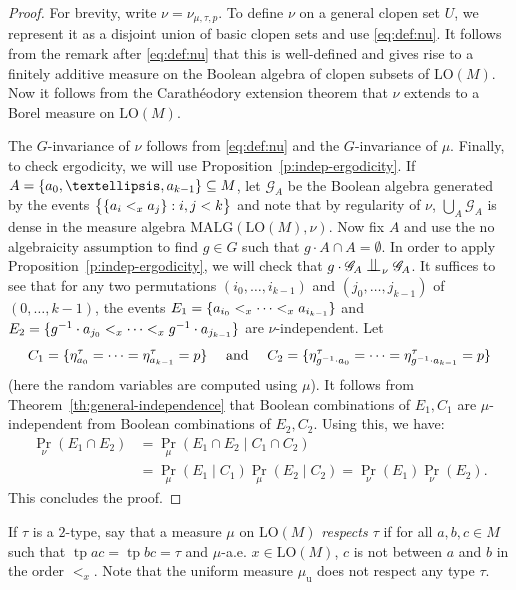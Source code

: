 \documentclass[11pt]{article}
\providecommand{\And}{}\numberwithin{equation}{section}
\let\mathcal\mathscr
\let\sub\subseteq
\theoremstyle{plain}
\theoremstyle{definition}
\newcommand{\cG}{\mathcal{G}}
\DeclareMathOperator{\tp}{tp}
\DeclarePairedDelimiter\set{\{}{\}}
\newcommand{\LO}{\mathrm{LO}}
\newcommand{\MALG}{\mathrm{MALG}}
\newcommand{\muu}{\mu_{\mathrm{u}}}
\renewcommand{\And}{\text{ and }}
\newcommand{\indep}[1][]{%
  \mathrel{
    \mathop{
      \scalebox{1}[1.3]{\text{$\perp\!\!\!\perp$}}
    }\displaylimits_{#1}
  }
}
\begin{document}
\begin{proof}
For brevity, write $\nu = \nu_{\mu, \tau, p}$. To define $\nu$ on a general clopen set $U$, we represent it as a disjoint union of basic clopen sets and use \eqref{eq:def:nu}. It follows from the remark after \eqref{eq:def:nu} that this is well-defined and gives rise to a finitely additive measure on the Boolean algebra of clopen subsets of $\LO(M)$. Now it follows from the Carathéodory extension theorem that $\nu$ extends to a Borel measure on $\LO(M)$.

The $G$-invariance of $\nu$ follows from \eqref{eq:def:nu} and the $G$-invariance of $\mu$. Finally, to check ergodicity, we will use Proposition~\ref{p:indep-ergodicity}. If $A = \set{a_0, \ldots, a_{k-1}} \sub M$, let $\cG_A$ be the Boolean algebra generated by the events $\set[\big]{\set{a_i <_x a_j} : i, j < k}$ and note that by regularity of $\nu$, $\bigcup_A \cG_A$ is dense in the measure algebra $\MALG(\LO(M), \nu)$. Now fix $A$ and use the no algebraicity assumption to find $g \in G$ such that $g \cdot A \cap A = \emptyset$. In order to apply Proposition~\ref{p:indep-ergodicity}, we will check that $g \cdot \cG_A \indep_\nu \cG_A$. It suffices to see that for any two permutations $(i_0, \ldots, i_{k-1})$ and $(j_0, \ldots, j_{k-1})$ of $(0, \ldots, k-1)$, the events $E_1 = \set{a_{i_0} <_x \cdots <_x a_{i_{k-1}}}$ and $E_2 = \set{g^{-1} \cdot a_{j_0} <_x \cdots <_x g^{-1} \cdot a_{j_{k-1}}}$ are $\nu$-independent. Let\vspace*{-3pt}
\[
C_1 = \set{\eta_{a_0}^\tau = \cdots = \eta_{a_{k-1}}^\tau = p} \quad\And\quad C_2 = \set{\eta_{g^{-1} \cdot a_0}^\tau = \cdots = \eta_{g^{-1} \cdot a_{k-1}}^\tau = p}
\]
(here the random variables are computed using $\mu$). It follows from Theorem~\ref{th:general-independence} that Boolean combinations of $E_1, C_1$ are $\mu$-independent from Boolean combinations of $E_2, C_2$. Using this, we have:
\begin{equation*}
\begin{split}
\Pr_\nu(E_1 \cap E_2) &= \Pr_\mu(E_1 \cap E_2 \mid C_1 \cap C_2) \\
&= \Pr_\mu(E_1 \mid C_1) \Pr_\mu(E_2 \mid C_2) = \Pr_\nu(E_1) \Pr_\nu(E_2).
\end{split}
\end{equation*}
This concludes the proof.
\end{proof}

If $\tau$ is a $2$-type, say that a measure $\mu$ on $\LO(M)$ \emph{respects $\tau$} if for all $a, b, c \in M$ such that $\tp ac = \tp bc = \tau$ and $\mu$-a.e. $x \in \LO(M)$, $c$ is not between $a$ and $b$ in the order $<_x$. Note that the uniform measure $\muu$ does not respect any type $\tau$.
\end{document}
